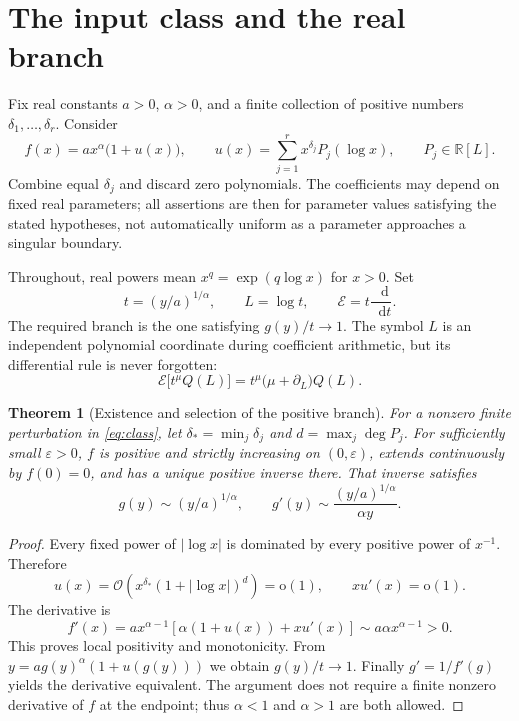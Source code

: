 \documentclass[11pt,a4paper]{article}
\numberwithin{equation}{section}
\newtheorem{theorem}{Theorem}[section]
\theoremstyle{definition}\newtheorem{definition}[theorem]{Definition}
\theoremstyle{remark}\newtheorem{remark}[theorem]{Remark}
\newcommand{\R}{\mathbb R}\newcommand{\N}{\mathbb N}
\newcommand{\Eul}{\mathcal E}
\newcommand{\dd}{\mathop{}\!\mathrm d}
\newcommand{\bigO}{\mathcal O}
\newcommand{\smallo}{\mathrm o}
\begin{document}
\section{The input class and the real branch}
\label{sec:class}

Fix real constants \(a>0\), \(\alpha>0\), and a finite collection of positive
numbers \(\delta_1,\ldots,\delta_r\). Consider
\begin{equation}\label{eq:class}
 f(x)=a x^\alpha\bigl(1+u(x)\bigr),\qquad
 u(x)=\sum_{j=1}^r x^{\delta_j}P_j(\log x),\qquad P_j\in\R[L].
\end{equation}
Combine equal \(\delta_j\) and discard zero polynomials. The coefficients
may depend on fixed real parameters; all assertions are then for parameter
values satisfying the stated hypotheses, not automatically uniform as a
parameter approaches a singular boundary.

Throughout, real powers mean \(x^q=\exp(q\log x)\) for \(x>0\). Set
\begin{equation}\label{eq:normalization}
 t=(y/a)^{1/\alpha},\qquad L=\log t,
 \qquad\Eul=t\frac{\dd}{\dd t}.
\end{equation}
The required branch is the one satisfying \(g(y)/t\to1\).
The symbol \(L\) is an independent polynomial coordinate during coefficient
arithmetic, but its differential rule is never forgotten:
\begin{equation}\label{eq:euler-block}
 \Eul\bigl[t^\mu Q(L)\bigr]
 =t^\mu\bigl(\mu+\partial_L\bigr)Q(L).
\end{equation}

\begin{theorem}[Existence and selection of the positive branch]\label{thm:branch}
For a nonzero finite perturbation in \eqref{eq:class}, let
\(\delta_* =\min_j\delta_j\) and \(d=\max_j\deg P_j\).
For sufficiently small \(\varepsilon>0\), \(f\) is positive and strictly
increasing on \((0,\varepsilon)\), extends continuously by \(f(0)=0\), and
has a unique positive inverse there. That inverse satisfies
\[
 g(y)\sim (y/a)^{1/\alpha},\qquad
 g'(y)\sim \frac{(y/a)^{1/\alpha}}{\alpha y}.
\]
\end{theorem}
\begin{proof}
Every fixed power of \(|\log x|\) is dominated by every positive power of
\(x^{-1}\). Therefore
\[
 u(x)=\bigO\!\left(x^{\delta_*}(1+|\log x|)^d\right)=\smallo(1),
 \qquad xu'(x)=\smallo(1).
\]
The derivative is
\[
 f'(x)=a x^{\alpha-1}
 \left[\alpha(1+u(x))+xu'(x)\right]
 \sim a\alpha x^{\alpha-1}>0.
\]
This proves local positivity and monotonicity. From
\(y=a g(y)^\alpha(1+u(g(y)))\) we obtain \(g(y)/t\to1\).
Finally \(g'=1/f'(g)\) yields the derivative equivalent. The argument does
not require a finite nonzero derivative of \(f\) at the endpoint; thus
\(\alpha<1\) and \(\alpha>1\) are both allowed.
\end{proof}
\end{document}
